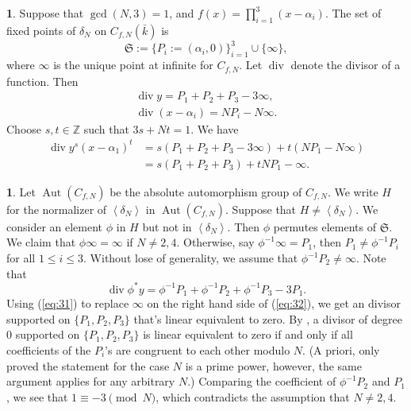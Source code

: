 \documentclass{amsart}[11pt]
\theoremstyle{definition}
\newtheorem{sect}[thm]{}
\numberwithin{equation}{section}
\theoremstyle{notitle}
\begin{document}
\begin{sect}
  Suppose that $\gcd(N,3)=1$, and
  $f(x)=\prod_{i=1}^3(x-\alpha_i)$. The set of fixed points of
  $\delta_N$ on $C_{f,N}(\bar{k})$ is
\[ {\mathfrak{S}}:=\{ P_i:=(\alpha_i, 0)\}_{i=1}^3\cup \{\infty\},\]
where $\infty$ is the unique point at infinite for $C_{f,N}$. Let
$\operatorname{div}$ denote the divisor of a function. Then
\begin{gather}
  \operatorname{div} y =  P_1+P_2+P_3-3\infty,\\
  \operatorname{div} (x-\alpha_i)= N P_i- N\infty.
\end{gather}  
Choose $s, t\in {\mathbb{Z}}$ such that $3s+Nt=1$. We have
  \begin{equation}
    \label{eq:31}
    \begin{split}
    \operatorname{div} y^s(x-\alpha_1)^t& = s(P_1+P_2+P_3-3\infty)+ t
    (NP_1-N\infty)\\
    &= s(P_1+P_2+P_3)+tNP_1 - \infty      .
    \end{split}
 \end{equation}

\end{sect}

\begin{sect}
  Let $\operatorname{Aut}(C_{f,N})$ be the absolute automorphism group of
  $C_{f,N}$. We write $H$ for the normalizer of ${\left\langle {\delta_N} \right\rangle}$ in
  $\operatorname{Aut}(C_{f,N})$. Suppose that $H\neq {\left\langle {\delta_N} \right\rangle}$. We consider
  an element $\phi$ in $H$ but not in ${\left\langle {\delta_N} \right\rangle}$.  Then
  $\phi$ permutes elements of ${\mathfrak{S}}$.  We claim that $\phi \infty=
  \infty$ if $N\neq 2, 4$. Otherwise, say $\phi^{-1} \infty = P_1$,
  then $P_1\neq \phi^{-1} P_i$ for all $1\leq i\leq 3$.  Without lose
  of generality, we assume that $\phi^{-1} P_2\neq \infty$. Note that
  \begin{equation}
    \label{eq:32}
 \operatorname{div} \phi^*y= \phi^{-1} P_1 + \phi^{-1} P_2 + \phi^{-1} P_3 - 3P_1.    
  \end{equation}
  Using (\ref{eq:31}) to replace $\infty$ on the right hand side of
  (\ref{eq:32}), we get an divisor supported on $\{P_1, P_2, P_3\}$
  that's linear equivalent to zero. By \cite[Lemma 2.7]{xue_JNT}, a
  divisor of degree 0 supported on $\{P_1, P_2, P_3\}$ is linear
  equivalent to zero if and only if all coefficients of the $P_i$'s
  are congruent to each other modulo $N$. (A priori, \cite[Lemma
  2.7]{xue_JNT} only proved the statement for the case $N$ is a prime
  power, however, the same argument applies for any arbitrary $N$.)
  Comparing the coefficient of $\phi^{-1} P_2$ and $P_1$, we see that
  $1\equiv -3 \pmod{N}$, which contradicts the assumption that $N\neq
  2,4$.
\end{sect}
\end{document}
